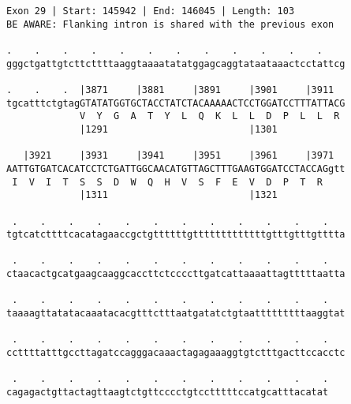\documentclass{article}
\begin{document}
\begin{Verbatim}[fontfamily=courier]
Exon 29 | Start: 145942 | End: 146045 | Length: 103
BE AWARE: Flanking intron is shared with the previous exon

.    .    .    .    .    .    .    .    .    .    .    .    
gggctgattgtcttcttttaaggtaaaatatatggagcaggtataataaactcctattcg

.    .    .  |3871     |3881     |3891     |3901     |3911  
tgcatttctgtagGTATATGGTGCTACCTATCTACAAAAACTCCTGGATCCTTTATTACG
             V  Y  G  A  T  Y  L  Q  K  L  L  D  P  L  L  R 
             |1291                         |1301            

   |3921     |3931     |3941     |3951     |3961     |3971  
AATTGTGATCACATCCTCTGATTGGCAACATGTTAGCTTTGAAGTGGATCCTACCAGgtt
 I  V  I  T  S  S  D  W  Q  H  V  S  F  E  V  D  P  T  R    
             |1311                         |1321            

 .    .    .    .    .    .    .    .    .    .    .    .   
tgtcatcttttcacatagaaccgctgttttttgtttttttttttttgtttgtttgtttta

 .    .    .    .    .    .    .    .    .    .    .    .   
ctaacactgcatgaagcaaggcaccttctccccttgatcattaaaattagtttttaatta

 .    .    .    .    .    .    .    .    .    .    .    .   
taaaagttatatacaaatacacgtttctttaatgatatctgtaatttttttttaaggtat

 .    .    .    .    .    .    .    .    .    .    .    .   
ccttttatttgccttagatccagggacaaactagagaaaggtgtctttgacttccacctc

 .    .    .    .    .    .    .    .    .    .    .    .
cagagactgttactagttaagtctgttcccctgtcctttttccatgcatttacatat
\end{Verbatim}
\newpage
\end{document}
